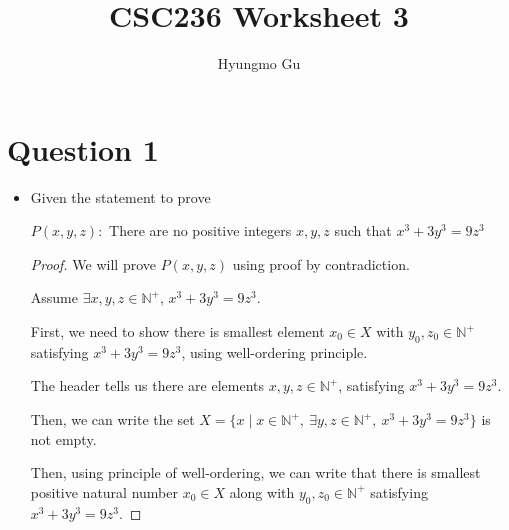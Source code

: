 \documentclass[12pt]{article}
\begin{document}
\title{CSC236 Worksheet 3}
\author{Hyungmo Gu}
\maketitle

\section*{Question 1}

\bigskip

\begin{itemize}
    \item
    Given the statement to prove

    \bigskip

    \begin{center}
        $P(x,y,z):$ There are no positive integers $x,y,z$ such that $x^3 + 3y^3 = 9z^3$
    \end{center}

    \bigskip

    \begin{proof}

        We will prove $P(x,y,z)$ using proof by contradiction.

        \bigskip

        Assume $\exists x,y,z \in \mathbb{N}^{+}$, $x^3 + 3y^3 = 9z^3$.

        \bigskip

        First, we need to show there is smallest element $x_0 \in X$ with $y_0,z_0 \in \mathbb{N}^+$
        satisfying $x^3 + 3y^3 = 9z^3$, using well-ordering principle.

        \bigskip

        The header tells us there are elements $x,y,z \in \mathbb{N}^+$, satisfying
        $x^3 + 3y^3 = 9z^3$.

        \bigskip

        Then, we can write the set $X = \{x \mid x \in \mathbb{N}^+,\:\exists y,z \in
        \mathbb{N}^+,\:x^3 + 3y^3 = 9z^3\}$ is not empty.

        \bigskip

        Then, using principle of well-ordering, we can write that there is smallest
        positive natural number $x_0 \in X$ along with $y_0,z_0 \in \mathbb{N}^+$ satisfying
        $x^3 + 3y^3 = 9z^3$.

        \bigskip

    \end{proof}
\end{itemize}
\end{document}
